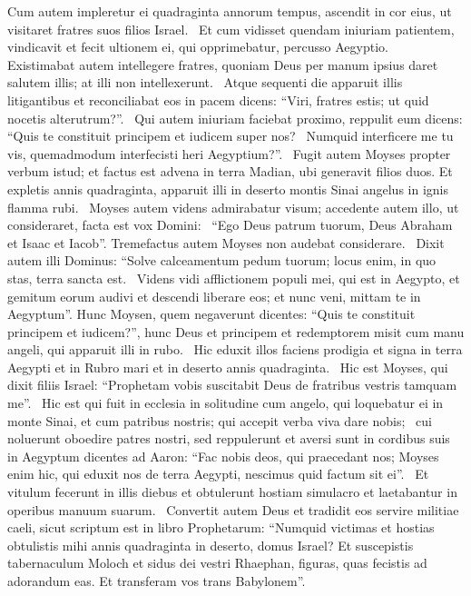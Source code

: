 \begin{biblechapter}
\verse Cum autem impleretur ei quadraginta annorum tempus, ascendit in cor eius, ut visitaret fratres suos filios Israel.  
\verse Et cum vidisset quendam iniuriam patientem, vindicavit et fecit ultionem ei, qui opprimebatur, percusso Aegyptio.  
\verse Existimabat autem intellegere fratres, quoniam Deus per manum ipsius daret salutem illis; at illi non intellexerunt.  
\verse Atque sequenti die apparuit illis litigantibus et reconciliabat eos in pacem dicens: “Viri, fratres estis; ut quid nocetis alterutrum?”.  
\verse Qui autem iniuriam faciebat proximo, reppulit eum dicens: “Quis te constituit principem et iudicem super nos?  
\verse Numquid interficere me tu vis, quemadmodum interfecisti heri Aegyptium?”.  
\verse Fugit autem Moyses propter verbum istud; et factus est advena in terra Madian, ubi generavit filios duos. 
\verse Et expletis annis quadraginta, apparuit illi in deserto montis Sinai angelus in ignis flamma rubi.  
\verse Moyses autem videns admirabatur visum; accedente autem illo, ut consideraret, facta est vox Domini:  
\verse “Ego Deus patrum tuorum, Deus Abraham et Isaac et Iacob”. Tremefactus autem Moyses non audebat considerare.  
\verse Dixit autem illi Dominus: “Solve calceamentum pedum tuorum; locus enim, in quo stas, terra sancta est.  
\verse Videns vidi afflictionem populi mei, qui est in Aegypto, et gemitum eorum audivi et descendi liberare eos; et nunc veni, mittam te in Aegyptum”. 
\verse Hunc Moysen, quem negaverunt dicentes: “Quis te constituit principem et iudicem?”, hunc Deus et principem et redemptorem misit cum manu angeli, qui apparuit illi in rubo.  
\verse Hic eduxit illos faciens prodigia et signa in terra Aegypti et in Rubro mari et in deserto annis quadraginta.  
\verse Hic est Moyses, qui dixit filiis Israel: “Prophetam vobis suscitabit Deus de fratribus vestris tamquam me”.  
\verse Hic est qui fuit in ecclesia in solitudine cum angelo, qui loquebatur ei in monte Sinai, et cum patribus nostris; qui accepit verba viva dare nobis;  
\verse cui noluerunt oboedire patres nostri, sed reppulerunt et aversi sunt in cordibus suis in Aegyptum
\verse dicentes ad Aaron: “Fac nobis deos, qui praecedant nos; Moyses enim hic, qui eduxit nos de terra Aegypti, nescimus quid factum sit ei”.  
\verse Et vitulum fecerunt in illis diebus et obtulerunt hostiam simulacro et laetabantur in operibus manuum suarum.  
\verse Convertit autem Deus et tradidit eos servire militiae caeli, sicut scriptum est in libro Prophetarum: “Numquid victimas et hostias obtulistis mihi annis quadraginta in deserto, domus Israel? 
\verse Et suscepistis tabernaculum Moloch et sidus dei vestri Rhaephan, figuras, quas fecistis ad adorandum eas. Et transferam vos trans Babylonem”. 

\end{biblechapter}
